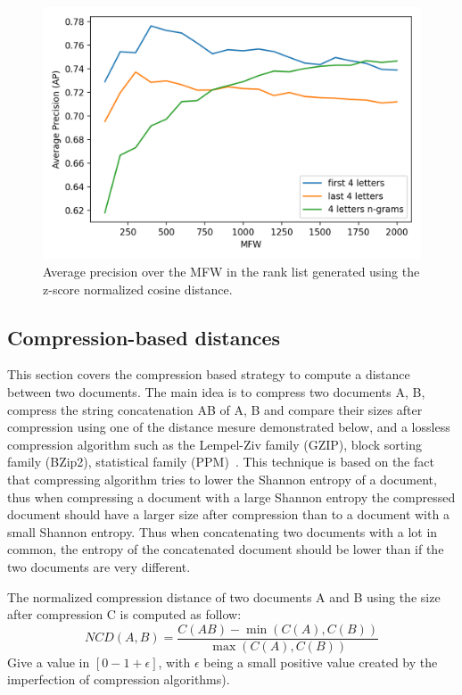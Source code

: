 \begin{figure}
  \includegraphics[width=\linewidth]{img/first_last_letters_ngrams.png}
  \caption{Average precision over the MFW in the rank list generated using the z-score normalized cosine distance.}
  \label{fig:first_last_letters_ngrams}
\end{figure}

\subsection{Compression-based distances}

This section covers the compression based strategy to compute a distance between two documents.
The main idea is to compress two documents A, B, compress the string concatenation AB of A, B and compare their sizes after compression using one of the distance mesure demonstrated below, and a lossless compression algorithm such as the Lempel-Ziv family (GZIP), block sorting family (BZip2), statistical family (PPM)~\cite{comparing_compression}.
This technique is based on the fact that compressing algorithm tries to lower the Shannon entropy of a document, thus when compressing a document with a large Shannon entropy the compressed document should have a larger size after compression than to a document with a small Shannon entropy.
Thus when concatenating two documents with a lot in common, the entropy of the concatenated document should be lower than if the two documents are very different.

\begin{definition}
  The normalized compression distance of two documents A and B using the size after compression C is computed as follow:
  \begin{equation}
    NCD(A, B) = \frac{C(AB) - \min(C(A), C(B))}{\max(C(A), C(B))}
  \end{equation}
  Give a value in $\left[0-1+\epsilon\right]$, with $\epsilon$ being a small positive value created by the imperfection of compression algorithms).
\end{definition}

